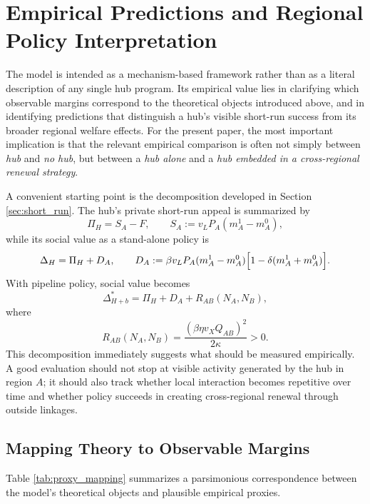 \section{Empirical Predictions and Regional Policy Interpretation}
\label{sec:policy}

The model is intended as a mechanism-based framework rather than as a literal description of any single hub program. Its empirical value lies in clarifying which observable margins correspond to the theoretical objects introduced above, and in identifying predictions that distinguish a hub's visible short-run success from its broader regional welfare effects. For the present paper, the most important implication is that the relevant empirical comparison is often not simply between \emph{hub} and \emph{no hub}, but between a \emph{hub alone} and a \emph{hub embedded in a cross-regional renewal strategy}.

A convenient starting point is the decomposition developed in Section \ref{sec:short_run}. The hub's private short-run appeal is summarized by
\[
\Pi_H = S_A-F,
\qquad
S_A:=v_LP_A(m_A^1-m_A^0),
\]
while its social value as a stand-alone policy is
\[
\Delta_H=\Pi_H+D_A,
\qquad
D_A:=\beta v_LP_A(m_A^1-m_A^0)\Bigl[1-\delta(m_A^1+m_A^0)\Bigr].
\]
With pipeline policy, social value becomes
\[
\Delta_{H+b}^*=\Pi_H+D_A+R_{AB}(N_A,N_B),
\]
where
\[
R_{AB}(N_A,N_B)=\frac{(\beta\eta v_XQ_{AB})^2}{2\kappa}>0.
\]
This decomposition immediately suggests what should be measured empirically. A good evaluation should not stop at visible activity generated by the hub in region $A$; it should also track whether local interaction becomes repetitive over time and whether policy succeeds in creating cross-regional renewal through outside linkages.

\subsection{Mapping Theory to Observable Margins}

Table \ref{tab:proxy_mapping} summarizes a parsimonious correspondence between the model's theoretical objects and plausible empirical proxies.

